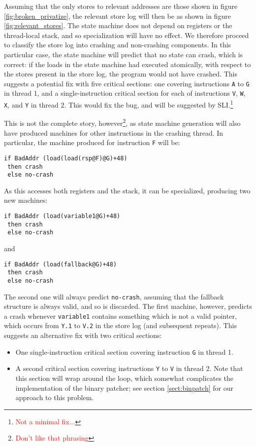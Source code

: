 \documentclass[10pt,twocolumn,preprint,natbib,authoryear]{sigplanconf}
\newcommand{\editorial}[1]{\textcolor{red}{\footnote{\textcolor{red}{#1}}}}
\begin{document}
Assuming that the only stores to relevant addresses are those shown in
figure \ref{fig:broken_privatize}, the relevant store log will then be
as shown in figure \ref{fig:relevant_stores}.  The state machine does
not depend on registers or the thread-local stack, and so
specialization will have no effect.  We therefore proceed to classify
the store log into crashing and non-crashing components.  In this
particular case, the state machine will predict that no state can
crash, which is correct: if the loads in the state machine had
executed atomically, with respect to the stores present in the store
log, the program would not have crashed.  This suggests a potential
fix with five critical sections: one covering instructions \verb|A| to
\verb|G| in thread 1, and a single-instruction critical section for
each of instructions \verb|V|, \verb|W|, \verb|X|, and \verb|Y| in
thread 2.  This would fix the bug, and will be suggested by
SLI.\editorial{Not a minimal fix...}

This is not the complete story, however\editorial{Don't like that
  phrasing}, as state machine generation will also have produced
machines for other instructions in the crashing thread.  In
particular, the machine produced for instruction \verb|F| will be:

\begin{verbatim}
if BadAddr (load(load(rsp@F)@G)+48)
 then crash
 else no-crash
\end{verbatim}

As this accesses both registers and the stack, it can be specialized,
producing two new machines:

\begin{verbatim}
if BadAddr (load(variable1@G)+48)
 then crash
 else no-crash
\end{verbatim}

and

\begin{verbatim}
if BadAddr (load(fallback@G)+48)
 then crash
 else no-crash
\end{verbatim}

The second one will always predict \verb|no-crash|, assuming that the
fallback structure is always valid, and so is discarded.  The first
machine, however, predicts a crash whenever \verb|variable1| contains
something which is not a valid pointer, which occurs from \verb|Y.1|
to \verb|V.2| in the store log (and subsequent repeats).  This
suggests an alternative fix with two critical sections:

\begin{itemize}
\item One single-instruction critical section covering instruction
  \verb|G| in thread 1.
\item A second critical section covering instructions \verb|Y| to
  \verb|V| in thread 2.  Note that this section will wrap around the
  loop, which somewhat complicates the implementation of the binary
  patcher; see section \ref{sect:binpatch} for our approach to this
  problem.
\end{itemize}
\end{document}
